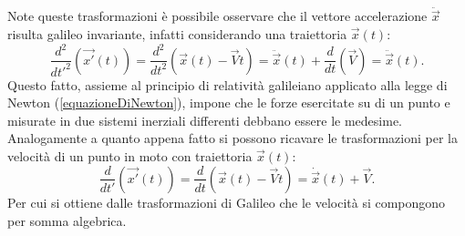 Note queste trasformazioni è possibile osservare che il vettore accelerazione $\ddot{\vec{x}}$ risulta galileo invariante, infatti considerando una traiettoria $\vec{x}(t)$:
\begin{equation*}
	\frac{d^2}{dt'^2}(\vec{x'}(t))=\frac{d^2}{dt^2}(\vec{x}(t)-\vec{V}t)=\ddot{\vec{x}}(t)+\frac{d}{dt}(\vec{V})=\ddot{\vec{x}}(t).
\end{equation*} 
Questo fatto, assieme al principio di relatività galileiano applicato alla legge di Newton (\ref{equazioneDiNewton}), 
impone che le forze esercitate su di un punto e misurate in due sistemi inerziali differenti debbano essere le medesime. \\

Analogamente a quanto appena fatto si possono ricavare le trasformazioni per la velocità di un punto in moto con traiettoria $\vec{x}(t)$:
\begin{equation}
	\frac{d}{dt'}(\vec{x'}(t))=\frac{d}{dt}(\vec{x}(t)-\vec{V}t)=\dot{\vec{x}}(t)+\vec{V}.
\end{equation}
Per cui si ottiene dalle trasformazioni di Galileo che le velocità si compongono per somma algebrica.\\

